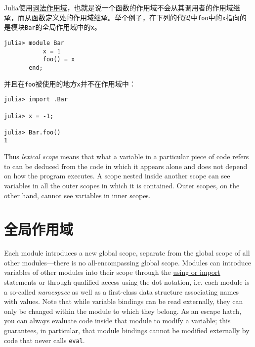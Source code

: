 Julia使用\href{https://en.wikipedia.org/wiki/Scope\_\%28computer\_science\%29\#Lexical\_scoping\_vs.\_dynamic\_scoping}{词法作用域}，也就是说一个函数的作用域不会从其调用者的作用域继承，而从函数定义处的作用域继承。举个例子，在下列的代码中\texttt{foo}中的\texttt{x}指向的是模块\texttt{Bar}的全局作用域中的\texttt{x}。




\begin{verbatim}
julia> module Bar
           x = 1
           foo() = x
       end;
\end{verbatim}



并且在\texttt{foo}被使用的地方\texttt{x}并不在作用域中：




\begin{verbatim}
julia> import .Bar

julia> x = -1;

julia> Bar.foo()
1
\end{verbatim}



Thus \emph{lexical scope} means that what a variable in a particular piece of code refers to can be deduced from the code in which it appears alone and does not depend on how the program executes. A scope nested inside another scope can {\textquotedbl}see{\textquotedbl} variables in all the outer scopes in which it is contained. Outer scopes, on the other hand, cannot see variables in inner scopes.



\hypertarget{4662569705122519760}{}


\section{全局作用域}



Each module introduces a new global scope, separate from the global scope of all other modules—there is no all-encompassing global scope. Modules can introduce variables of other modules into their scope through the \hyperlink{16725527896995457152}{using or import} statements or through qualified access using the dot-notation, i.e. each module is a so-called \emph{namespace} as well as a first-class data structure associating names with values. Note that while variable bindings can be read externally, they can only be changed within the module to which they belong. As an escape hatch, you can always evaluate code inside that module to modify a variable; this guarantees, in particular, that module bindings cannot be modified externally by code that never calls \texttt{eval}.




